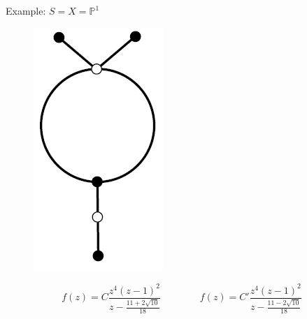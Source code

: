 \documentclass[pdf]{beamer}
\numberwithin{equation}{section}
\theoremstyle{plain}
\theoremstyle{plain}
\theoremstyle{remark}
\begin{document}
\begin{frame}{Example: $S=X=\mathbb{P}^1$}
\begin{figure}[th]
\begin{minipage}[b]{.2\textwidth}
	\includegraphics[width=.8\textwidth]{figures/eg6.png}
\end{minipage}
\end{figure}
	 $$\displaystyle f(z)=C\frac{z^4 (z-1)^2}{z-\frac{11+2\sqrt{10}}{18}}\qquad\qquad f(z)=C'\frac{z^4 (z-1)^2}{z-\frac{11-2\sqrt{10}}{18}}$$
\end{frame}
\end{document}
